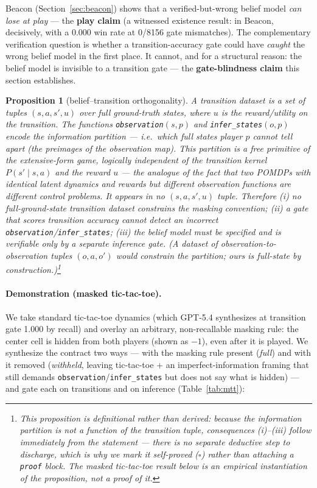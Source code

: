 \documentclass[11pt]{article}
\newtheorem{proposition}{Proposition}
\theoremstyle{remark}
\begin{document}
Beacon (Section~\ref{sec:beacon}) shows that a verified-but-wrong belief model \emph{can lose at play} --- the \textbf{play claim} (a witnessed existence result: in Beacon, decisively, with a 0.000 win rate at 0/8156 gate mismatches). The complementary verification question is whether a transition-accuracy gate could have \emph{caught} the wrong belief model in the first place. It cannot, and for a structural reason: the belief model is invisible to a transition gate --- the \textbf{gate-blindness claim} this section establishes.

\begin{proposition}[belief--transition orthogonality]
\label{prop:belieftrans}
A transition dataset is a set of tuples $(s, a, s', u)$ over \emph{full} ground-truth states, where $u$ is the reward/utility on the transition. The functions \texttt{observation}$(s, p)$ and \texttt{infer\_states}$(o, p)$ encode the information partition --- i.e.\ which full states player $p$ cannot tell apart (the preimages of the observation map). This partition is a \emph{free primitive} of the extensive-form game, logically independent of the transition kernel $P(s'\mid s,a)$ and the reward $u$ --- the analogue of the fact that two POMDPs with identical latent dynamics and rewards but different observation functions are different control problems. It appears in no $(s, a, s', u)$ tuple. Therefore (i) no \emph{full-ground-state} transition dataset constrains the masking convention; (ii) a gate that scores transition accuracy cannot detect an incorrect \texttt{observation}/\texttt{infer\_states}; (iii) the belief model must be specified and is verifiable only by a separate inference gate. (A dataset of observation-to-observation tuples $(o, a, o')$ \emph{would} constrain the partition; ours is full-state by construction.)\footnote{This proposition is definitional rather than derived: because the information partition is not a function of the transition tuple, consequences (i)--(iii) follow immediately from the statement --- there is no separate deductive step to discharge, which is why we mark it self-proved ($\square$) rather than attaching a \texttt{proof} block. The masked tic-tac-toe result below is an empirical instantiation of the proposition, not a proof of it.}\hfill\qedsymbol
\end{proposition}

\paragraph{Demonstration (masked tic-tac-toe).} We take standard tic-tac-toe dynamics (which GPT-5.4 synthesizes at transition gate 1.000 by recall) and overlay an arbitrary, non-recallable masking rule: the center cell is hidden from both players (shown as $-1$), even after it is played. We synthesize the contract two ways --- with the masking rule present (\emph{full}) and with it removed (\emph{withheld}, leaving tic-tac-toe + an imperfect-information framing that still demands \texttt{observation}/\texttt{infer\_states} but does not say what is hidden) --- and gate each on transitions and on inference (Table~\ref{tab:mtt}):
\end{document}
